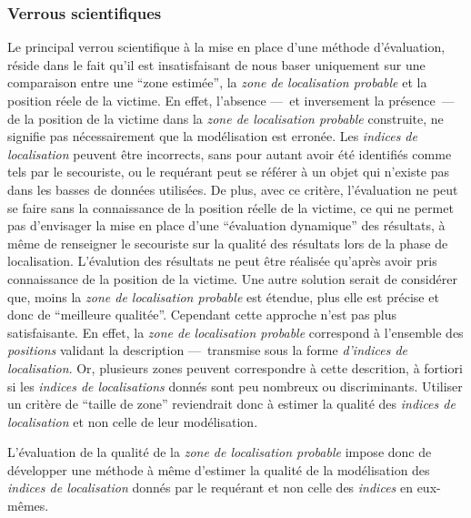 \subsubsection{Verrous scientifiques}

Le principal verrou scientifique à la mise en place d'une méthode
d'évaluation, réside dans le fait qu'il est insatisfaisant de nous
baser uniquement sur une comparaison entre une \enquote{zone estimée},
\ie la \emph{zone de localisation probable} et la position réele de la
victime. En effet, l'absence ---~et inversement la présence~--- de la
position de la victime dans la \emph{zone de localisation probable}
construite, ne signifie pas nécessairement que la modélisation est
erronée. Les \emph{indices de localisation} peuvent être incorrects,
sans pour autant avoir été identifiés comme tels par le secouriste, ou
le requérant peut se référer à un objet qui n'existe pas dans les
basses de données utilisées. De plus, avec ce critère, l'évaluation ne
peut se faire sans la connaissance de la position réelle de la
victime, ce qui ne permet pas d'envisager la mise en place d'une
\enquote{évaluation dynamique} des résultats, à même de renseigner le
secouriste sur la qualité des résultats lors de la phase de
localisation. L'évalution des résultats ne peut être réalisée qu'après
avoir pris connaissance de la position de la victime. Une autre
solution serait de considérer que, moins la \emph{zone de localisation
  probable} est étendue, plus elle est précise et donc de
\enquote{meilleure qualitée}. Cependant cette approche n'est pas plus
satisfaisante.  En effet, la \emph{zone de localisation probable}
correspond à l'ensemble des \emph{positions} validant la description
---~transmise sous la forme \emph{d'indices de localisation}. Or,
plusieurs zones peuvent correspondre à cette descrition, à fortiori si
les \emph{indices de localisations} donnés sont peu nombreux ou
discriminants. Utiliser un critère de \enquote{taille de zone}
reviendrait donc à estimer la qualité des \emph{indices de
  localisation} et non celle de leur modélisation.

L’évaluation de la qualité de la \emph{zone de localisation probable}
impose donc de développer une méthode à même d'estimer la qualité de
la modélisation des \emph{indices de localisation} donnés par le
requérant et non celle des \emph{indices} en eux-mêmes. 

